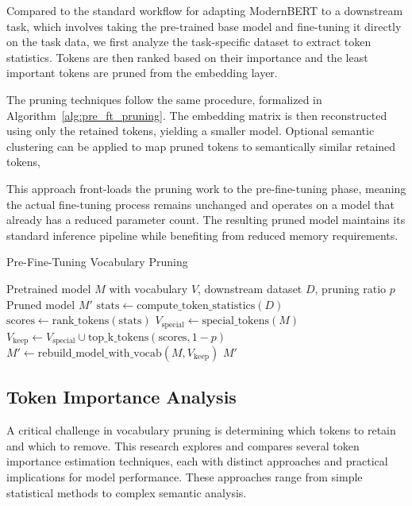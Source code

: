 \documentclass[twocolumn]{article}
\begin{document}
Compared to the standard workflow for adapting ModernBERT to a downstream task, which involves taking the pre-trained base model and fine-tuning it directly on the task data, we first analyze the task-specific dataset to extract token statistics. Tokens are then ranked based on their importance and the least important tokens are pruned from the embedding layer.

The pruning techniques follow the same procedure, formalized in Algorithm~\ref{alg:pre_ft_pruning}. The embedding matrix is then reconstructed using only the retained tokens, yielding a smaller model. Optional semantic clustering can be applied to map pruned tokens to semantically similar retained tokens, 

This approach front-loads the pruning work to the pre-fine-tuning phase, meaning the actual fine-tuning process remains unchanged and operates on a model that already has a reduced parameter count. The resulting pruned model maintains its standard inference pipeline while benefiting from reduced memory requirements.

\begin{algorithm}[H]
\small
\caption{Pre-Fine-Tuning Vocabulary Pruning}
\label{alg:pre_ft_pruning}
\begin{algorithmic}[1]
\Require Pretrained model $M$ with vocabulary $V$, downstream dataset $D$, pruning ratio $p$
\Ensure Pruned model $M'$
\State $\text{stats} \gets \text{compute\_token\_statistics}(D)$
\State $\text{scores} \gets \text{rank\_tokens}(\text{stats})$ 
\State $V_{\text{special}} \gets \text{special\_tokens}(M)$ 
\State $V_{\text{keep}} \gets V_{\text{special}} \cup \text{top\_k\_tokens}(\text{scores}, 1 - p)$
\State $M' \gets \text{rebuild\_model\_with\_vocab}(M, V_{\text{keep}})$
\State \Return $M'$
\end{algorithmic}
\end{algorithm}



\subsection{Token Importance Analysis}
A critical challenge in vocabulary pruning is determining which tokens to retain and which to remove. This research explores and compares several token importance estimation techniques, each with distinct approaches and practical implications for model performance. These approaches range from simple statistical methods to complex semantic analysis.
\end{document}
